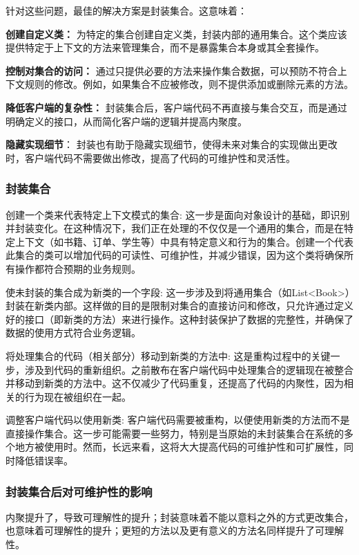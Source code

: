 针对这些问题，最佳的解决方案是封装集合。这意味着：

\textbf{创建自定义类：}
为特定的集合创建自定义类，封装内部的通用集合。这个类应该提供特定于上下文的方法来管理集合，而不是暴露集合本身或其全套操作。

\textbf{控制对集合的访问：}
通过只提供必要的方法来操作集合数据，可以预防不符合上下文规则的修改。例如，如果集合不应被修改，则不提供添加或删除元素的方法。

\textbf{降低客户端的复杂性：}
封装集合后，客户端代码不再直接与集合交互，而是通过明确定义的接口，从而简化客户端的逻辑并提高内聚度。

\textbf{隐藏实现细节}：
封装也有助于隐藏实现细节，使得未来对集合的实现做出更改时，客户端代码不需要做出修改，提高了代码的可维护性和灵活性。

\subsubsection{封装集合}

创建一个类来代表特定上下文模式的集合:
这一步是面向对象设计的基础，即识别并封装变化。在这种情况下，我们正在处理的不仅仅是一个通用的集合，而是在特定上下文（如书籍、订单、学生等）中具有特定意义和行为的集合。创建一个代表此集合的类可以增加代码的可读性、可维护性，并减少错误，因为这个类将确保所有操作都符合预期的业务规则。

使未封装的集合成为新类的一个字段:
这一步涉及到将通用集合（如List<Book>）封装在新类内部。这样做的目的是限制对集合的直接访问和修改，只允许通过定义好的接口（即新类的方法）来进行操作。这种封装保护了数据的完整性，并确保了数据的使用方式符合业务逻辑。

将处理集合的代码（相关部分）移动到新类的方法中:
这是重构过程中的关键一步，涉及到代码的重新组织。之前散布在客户端代码中处理集合的逻辑现在被整合并移动到新类的方法中。这不仅减少了代码重复，还提高了代码的内聚性，因为相关的行为现在被组织在一起。

调整客户端代码以使用新类:
客户端代码需要被重构，以便使用新类的方法而不是直接操作集合。这一步可能需要一些努力，特别是当原始的未封装集合在系统的多个地方被使用时。然而，长远来看，这将大大提高代码的可维护性和可扩展性，同时降低错误率。

\subsubsection{封装集合后对可维护性的影响}

内聚提升了，导致可理解性的提升；封装意味着不能以意料之外的方式更改集合，也意味着可理解性的提升；更短的方法以及更有意义的方法名同样提升了可理解性。

